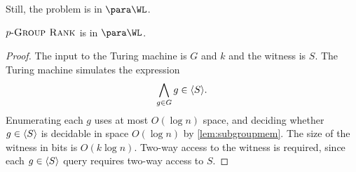 Still, the problem is in $\para \WL$.

\begin{theorem}
  $p \textnormal{-} \textsc{Group Rank}$ is in $\para \WL$.
\end{theorem}
\begin{proof}
  The input to the Turing machine is $G$ and $k$ and the witness is $S$.
  The Turing machine simulates the expression
  \[
  \bigwedge_{g \in G} g \in \langle S \rangle.
  \]
  Enumerating each $g$ uses at most $O(\log n)$ space, and deciding whether $g \in \langle S \rangle$ is decidable in space $O(\log n)$ by \autoref{lem:subgroupmem}.
  The size of the witness in bits is $O(k \log n)$.
  Two-way access to the witness is required, since each $g \in \langle S \rangle$ query requires two-way access to $S$.
\end{proof}
